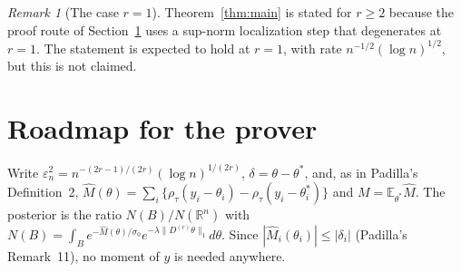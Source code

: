 \documentclass[11pt]{article}
\theoremstyle{definition}
\theoremstyle{remark}
\newtheorem{remark}{Remark}
\newcommand{\R}{\mathbb{R}}
\newcommand{\E}{\mathbb{E}}
\newcommand{\Dr}{D^{(r)}}
\newcommand{\thetas}{\theta^{*}}
\begin{document}
\begin{remark}[The case $r=1$]\label{rem:r1}
Theorem~\ref{thm:main} is stated for $r\ge 2$ because the proof route of Section~\ref{sec:roadmap} uses a sup-norm localization step that degenerates at $r=1$. The statement is expected to hold at $r=1$, with rate $n^{-1/2}(\log n)^{1/2}$, but this is not claimed.
\end{remark}

\section{Roadmap for the prover}\label{sec:roadmap}

Write $\varepsilon_n^2=n^{-(2r-1)/(2r)}(\log n)^{1/(2r)}$, $\delta=\theta-\thetas$, and, as in Padilla's Definition~2,
$\hat M(\theta)=\sum_i\{\rho_\tau(y_i-\theta_i)-\rho_\tau(y_i-\thetas_i)\}$ and $M=\E_{\thetas}\hat M$. The posterior is the ratio
$N(B)/N(\R^n)$ with $N(B)=\int_B e^{-\hat M(\theta)/\sigma_0}e^{-\lambda\|\Dr\theta\|_1}d\theta$. Since $|\hat M_i(\theta_i)|\le|\delta_i|$ (Padilla's Remark~11), no moment of $y$ is needed anywhere.
\end{document}
